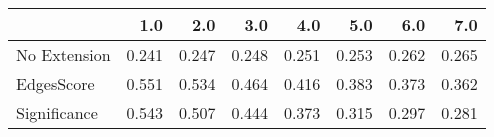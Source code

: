 \begin{tabular}{lrrrrrrr}
\toprule
{} &   1.0 &   2.0 &   3.0 &   4.0 &   5.0 &   6.0 &   7.0 \\
\midrule
No Extension & 0.241 & 0.247 & 0.248 & 0.251 & 0.253 & 0.262 & 0.265 \\
EdgesScore   & 0.551 & 0.534 & 0.464 & 0.416 & 0.383 & 0.373 & 0.362 \\
Significance & 0.543 & 0.507 & 0.444 & 0.373 & 0.315 & 0.297 & 0.281 \\
\bottomrule
\end{tabular}
